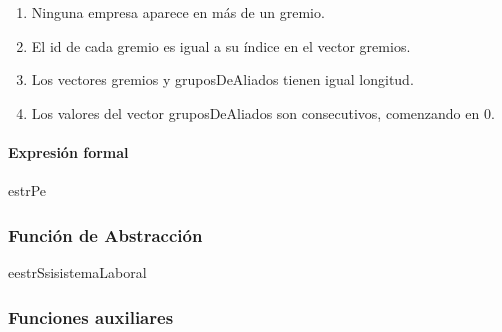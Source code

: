 \begin{enumerate}
	\item Ninguna empresa aparece en más de un gremio.
	\item El id de cada gremio es igual a su índice en el vector gremios.
	\item Los vectores gremios y gruposDeAliados tienen igual longitud.
	\item Los valores del vector gruposDeAliados son consecutivos, comenzando en 0.
\end{enumerate}

\paragraph{Expresión formal \\}
\begin{RepFormal}{estrP}{e}
\end{RepFormal}

\subsubsection{Funci\'on de Abstracci\'on}

\begin{FunAbsDescriptiva}{e}{estrS}{si}{sistemaLaboral}



\end{FunAbsDescriptiva}

\subsubsection{Funciones auxiliares}